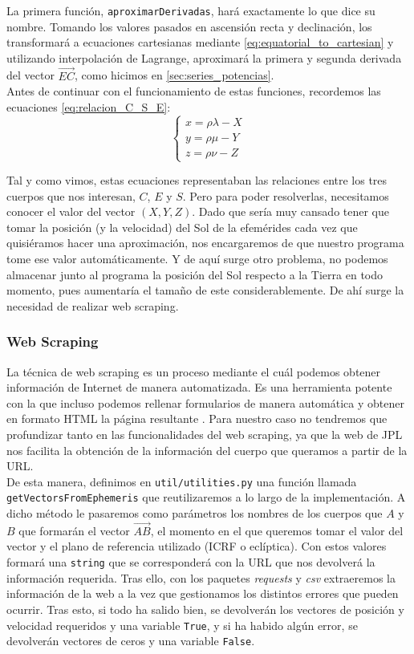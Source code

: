 \documentclass[11pt]{book}
\begin{document}
La primera función, \texttt{aproximarDerivadas}, hará exactamente lo que dice su nombre. Tomando los valores pasados en ascensión recta y declinación, los transformará a ecuaciones cartesianas mediante \eqref{eq:equatorial_to_cartesian} y utilizando interpolación de Lagrange, aproximará la primera y segunda derivada del vector $\overrightarrow{EC}$, como hicimos en \ref{sec:series_potencias}.\\

Antes de continuar con el funcionamiento de estas funciones, recordemos las ecuaciones \eqref{eq:relacion_C_S_E}:
\[
\left\{
\begin{array}{l}
	x=\rho\lambda-X\\
	y=\rho\mu-Y\\
	z=\rho\nu-Z
\end{array}
\right.
\]

Tal y como vimos, estas ecuaciones representaban las relaciones entre los tres cuerpos que nos interesan, $C$, $E$ y $S$. Pero para poder resolverlas, necesitamos conocer el valor del vector $(X,Y,Z)$. Dado que sería muy cansado tener que tomar la posición (y la velocidad) del Sol de la efemérides cada vez que quisiéramos hacer una aproximación, nos encargaremos de que nuestro programa tome ese valor automáticamente. Y de aquí surge otro problema, no podemos almacenar junto al programa la posición del Sol respecto a la Tierra en todo momento, pues aumentaría el tamaño de este considerablemente. De ahí surge la necesidad de realizar web scraping.\\

\subsubsection{Web Scraping}
La técnica de web scraping es un proceso mediante el cuál podemos obtener información de Internet de manera automatizada. Es una herramienta potente con la que incluso podemos rellenar formularios de manera automática y obtener en formato HTML la página resultante \cite{webscraping}. Para nuestro caso no tendremos que profundizar tanto en las funcionalidades del web scraping, ya que la web de JPL \cite{jpl} nos facilita la obtención de la información del cuerpo que queramos a partir de la URL.\\

De esta manera, definimos en \texttt{util/utilities.py} una función llamada \texttt{getVectorsFromEphemeris} que reutilizaremos a lo largo de la implementación. A dicho método le pasaremos como parámetros los nombres de los cuerpos que $A$ y $B$ que formarán el vector $\overrightarrow{AB}$, el momento en el que queremos tomar el valor del vector y el plano de referencia utilizado (ICRF o eclíptica). Con estos valores formará una \texttt{string} que se corresponderá con la URL que nos devolverá la información requerida. Tras ello, con los paquetes \textit{requests} y \textit{csv} extraeremos la información de la web a la vez que gestionamos los distintos errores que pueden ocurrir. Tras esto, si todo ha salido bien, se devolverán los vectores de posición y velocidad requeridos y una variable \texttt{True}, y si ha habido algún error, se devolverán vectores de ceros y una variable \texttt{False}.\\
\end{document}
